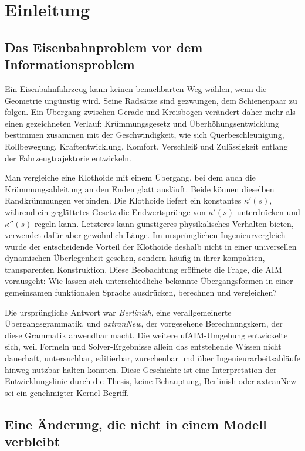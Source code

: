 
\chapter{Einleitung}

\section{Das Eisenbahnproblem vor dem Informationsproblem}

Ein Eisenbahnfahrzeug kann keinen benachbarten Weg wählen, wenn die Geometrie
ungünstig wird. Seine Radsätze sind gezwungen, dem Schienenpaar zu folgen. Ein
Übergang zwischen Gerade und Kreisbogen verändert daher mehr als einen
gezeichneten Verlauf: Krümmungsgesetz und Überhöhungsentwicklung bestimmen
zusammen mit der Geschwindigkeit, wie sich Querbeschleunigung, Rollbewegung,
Kraftentwicklung, Komfort, Verschleiß und Zulässigkeit entlang der
Fahrzeugtrajektorie entwickeln.

Man vergleiche eine Klothoide mit einem Übergang, bei dem auch die
Krümmungsableitung an den Enden glatt ausläuft. Beide können dieselben
Randkrümmungen verbinden. Die Klothoide liefert ein konstantes
\(\kappa'(s)\), während ein geglättetes Gesetz die Endwertsprünge von
\(\kappa'(s)\) unterdrücken und \(\kappa''(s)\) regeln kann. Letzteres kann
günstigeres physikalisches Verhalten bieten, verwendet dafür aber gewöhnlich
Länge. Im ursprünglichen Ingenieurvergleich wurde der entscheidende Vorteil
der Klothoide deshalb nicht in einer universellen dynamischen Überlegenheit
gesehen, sondern häufig in ihrer kompakten, transparenten Konstruktion. Diese
Beobachtung eröffnete die Frage, die AIM vorausgeht: Wie lassen sich
unterschiedliche bekannte Übergangsformen in einer gemeinsamen funktionalen
Sprache ausdrücken, berechnen und vergleichen?

Die ursprüngliche Antwort war \emph{Berlinish}, eine verallgemeinerte
Übergangsgrammatik, und \emph{axtranNew}, der vorgesehene Berechnungskern, der
diese Grammatik anwendbar macht. Die weitere ufAIM-Umgebung entwickelte sich,
weil Formeln und Solver-Ergebnisse allein das entstehende Wissen nicht
dauerhaft, untersuchbar, editierbar, zurechenbar und über
Ingenieurarbeitsabläufe hinweg nutzbar halten konnten. Diese Geschichte ist
eine Interpretation der Entwicklungslinie durch die Thesis, keine Behauptung,
Berlinish oder axtranNew sei ein genehmigter Kernel-Begriff.

\section{Eine Änderung, die nicht in einem Modell verbleibt}

